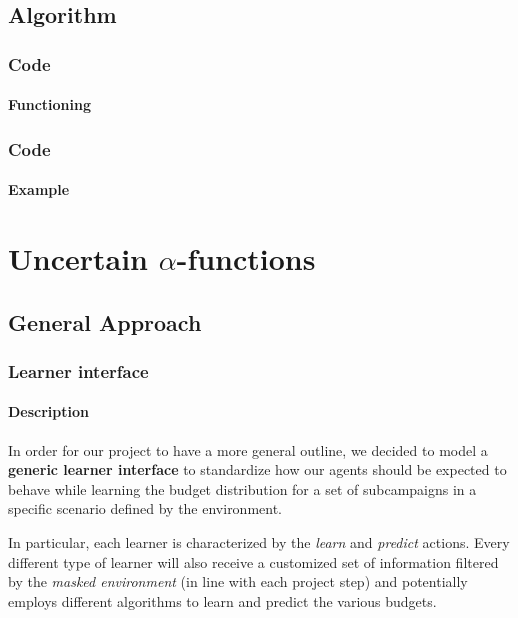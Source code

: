 \documentclass[11pt]{beamer}
\begin{document}
\subsection{Algorithm}


\begin{frame}

\frametitle{Code}
\framesubtitle{Functioning}


\end{frame}


\begin{frame}

\frametitle{Code}
\framesubtitle{Example}


\end{frame}


\AtBeginSection[]
{
\begin{frame}{}
    \tableofcontents[sections={\thesection}]
\end{frame}
}


\section{Uncertain $\alpha$-functions}


\subsection{General Approach}



\begin{frame}

\frametitle{Learner interface}
\framesubtitle{Description}

In order for our project to have a more general outline, we decided to model a \textbf{generic learner interface} to standardize how our agents should be expected to behave while learning the budget distribution for a set of subcampaigns in a specific scenario defined by the environment.

In particular, each learner is characterized by the \textit{learn} and \textit{predict} actions.
Every different type of learner will also receive a customized set of information filtered by the \textit{masked environment} (in line with each project step) and potentially employs different algorithms to learn and predict the various budgets.

\end{frame}
\end{document}
